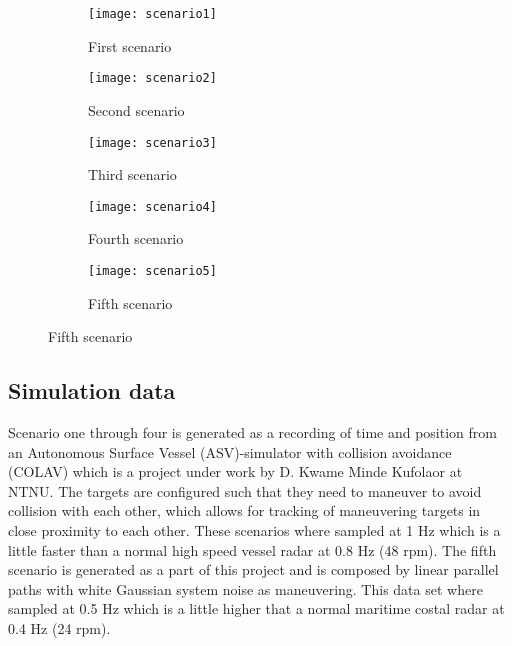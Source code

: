 \begin{figure}
    \centering
    \begin{subfigure}{0.49\textwidth}
        \centering
        \texttt{[image: scenario1]}
        \caption{First scenario}
    \end{subfigure}
    \begin{subfigure}{0.49\textwidth}
        \centering
        \texttt{[image: scenario2]}
        \caption{Second scenario}
    \end{subfigure}
    \begin{subfigure}{0.49\textwidth}
        \centering
        \texttt{[image: scenario3]}
        \caption{Third scenario}
    \end{subfigure}
    \begin{subfigure}{0.49\textwidth}
        \centering
        \texttt{[image: scenario4]}
        \caption{Fourth scenario}
    \end{subfigure}
    \begin{subfigure}{0.49\textwidth}
        \centering
        \texttt{[image: scenario5]}
        \caption{Fifth scenario}
    \end{subfigure}
\end{figure}

\subsection{Simulation data}
Scenario one through four is generated as a recording of time and position from an Autonomous Surface Vessel (ASV)-simulator with collision avoidance (COLAV) which is a project under work by D. Kwame Minde Kufolaor at NTNU. The targets are configured such that they need to maneuver to avoid collision with each other, which allows for tracking of maneuvering targets in close proximity to each other. These scenarios where sampled at 1 Hz which is a little faster than a normal high speed vessel radar at 0.8 Hz (48 rpm). The fifth scenario is generated as a part of this project and is composed by linear parallel paths with white Gaussian system noise as maneuvering. This data set where sampled at 0.5 Hz which is a little higher that a normal maritime costal radar at 0.4 Hz (24 rpm).

